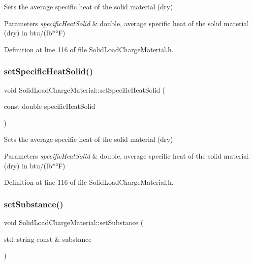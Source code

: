 Sets the average specific heat of the solid material (dry) 
\begin{DoxyParams}{Parameters}
{\em specific\+Heat\+Solid} & double, average specific heat of the solid material (dry) in btu/(lb$\ast$°F) \\
\hline
\end{DoxyParams}


Definition at line 116 of file Solid\+Load\+Charge\+Material.\+h.

\mbox{\label{class_solid_load_charge_material_ad9d2e3668a6a14700f4dced4882f98c0}} 
\subsubsection{\texorpdfstring{set\+Specific\+Heat\+Solid()}{setSpecificHeatSolid()}\hspace{0.1cm}{\footnotesize\ttfamily [3/3]}}
{\footnotesize\ttfamily void Solid\+Load\+Charge\+Material\+::set\+Specific\+Heat\+Solid (\begin{DoxyParamCaption}\item[{const double}]{specific\+Heat\+Solid }\end{DoxyParamCaption})\hspace{0.3cm}{\ttfamily [inline]}}

Sets the average specific heat of the solid material (dry) 
\begin{DoxyParams}{Parameters}
{\em specific\+Heat\+Solid} & double, average specific heat of the solid material (dry) in btu/(lb$\ast$°F) \\
\hline
\end{DoxyParams}


Definition at line 116 of file Solid\+Load\+Charge\+Material.\+h.

\mbox{\label{class_solid_load_charge_material_aebe376ab016f48678c3a70390b4ea52a}} 
\subsubsection{\texorpdfstring{set\+Substance()}{setSubstance()}\hspace{0.1cm}{\footnotesize\ttfamily [1/3]}}
{\footnotesize\ttfamily void Solid\+Load\+Charge\+Material\+::set\+Substance (\begin{DoxyParamCaption}\item[{std\+::string const \&}]{substance }\end{DoxyParamCaption})\hspace{0.3cm}{\ttfamily [inline]}}

